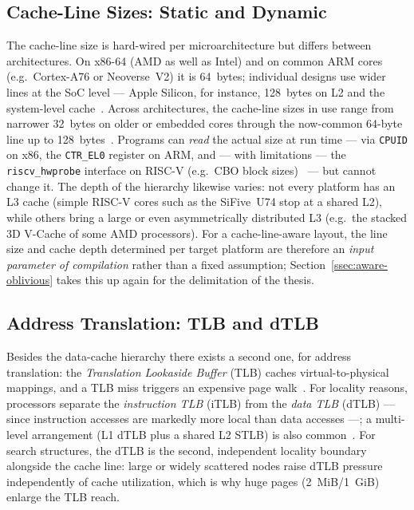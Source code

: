 \subsection{Cache-Line Sizes: Static and Dynamic}\label{ssec:cache-line-sizes}
The cache-line size is hard-wired per microarchitecture but differs between architectures. On x86-64
(AMD as well as Intel) and on common ARM cores (e.g.\ Cortex-A76 or Neoverse~V2) it is 64~bytes;
individual designs use wider lines at the SoC level --- Apple Silicon, for instance, 128~bytes on L2
and the system-level cache~\cite{apple_optimization}. Across architectures, the cache-line sizes in
use range from narrower 32~bytes on older or embedded cores through the now-common 64-byte line up
to 128~bytes~\cite{hennessy2019architecture,intel_optimization,amd_sog}. Programs can \emph{read}
the actual size at run time --- via \texttt{CPUID} on x86, the \texttt{CTR\_EL0} register on ARM,
and --- with limitations --- the \texttt{riscv\_hwprobe} interface on RISC-V (e.g.\ CBO block
sizes)~\cite{arm_arm,intel_sdm} --- but cannot change it. The depth of the hierarchy likewise
varies: not every platform has an L3 cache (simple RISC-V cores such as the SiFive~U74 stop at a
shared L2), while others bring a large or even asymmetrically distributed L3 (e.g.\ the stacked 3D
V-Cache of some AMD processors). For a cache-line-aware layout, the line size and cache depth
determined per target platform are therefore an \emph{input parameter of compilation} rather than a
fixed assumption; Section~\ref{ssec:aware-oblivious} takes this up again for the delimitation of the
thesis.

\subsection{Address Translation: TLB and dTLB}\label{ssec:tlb}
Besides the data-cache hierarchy there exists a second one, for address translation: the
\emph{Translation Lookaside Buffer} (TLB) caches virtual-to-physical mappings, and a TLB miss
triggers an expensive page walk~\cite{hennessy2019architecture}. For locality reasons, processors
separate the \emph{instruction TLB} (iTLB) from the \emph{data TLB} (dTLB) --- since instruction
accesses are markedly more local than data accesses ---; a multi-level arrangement (L1 dTLB plus a
shared L2 STLB) is also common~\cite{intel_sdm,drepper2007memory}. For search structures, the dTLB
is the second, independent locality boundary alongside the cache line: large or widely scattered
nodes raise dTLB pressure independently of cache utilization, which is why huge pages (2~MiB/1~GiB)
enlarge the TLB reach.


